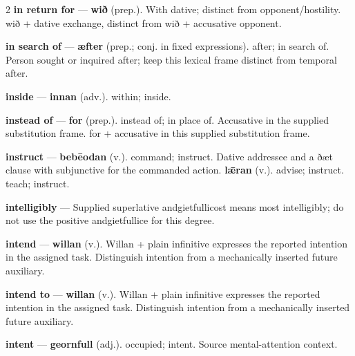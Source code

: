 \begin{multicols}{2}
\textbf{in return for} — \textbf{wið} (prep.). With dative; distinct from opponent/hostility. wið + dative exchange, distinct from wið + accusative opponent.\par
\textbf{in search of} — \textbf{æfter} (prep.; conj. in fixed expressions). after; in search of. Person sought or inquired after; keep this lexical frame distinct from temporal after.\par
\textbf{inside} — \textbf{innan} (adv.). within; inside.\par
\textbf{instead of} — \textbf{for} (prep.). instead of; in place of. Accusative in the supplied substitution frame. for + accusative in this supplied substitution frame.\par
\textbf{instruct} — \textbf{bebēodan} (v.). command; instruct. Dative addressee and a ðæt clause with subjunctive for the commanded action. \textbf{lǣran} (v.). advise; instruct. teach; instruct.\par
\textbf{intelligibly} — Supplied superlative andgietfullicost means most intelligibly; do not use the positive andgietfullice for this degree.\par
\textbf{intend} — \textbf{willan} (v.). Willan + plain infinitive expresses the reported intention in the assigned task. Distinguish intention from a mechanically inserted future auxiliary.\par
\textbf{intend to} — \textbf{willan} (v.). Willan + plain infinitive expresses the reported intention in the assigned task. Distinguish intention from a mechanically inserted future auxiliary.\par
\textbf{intent} — \textbf{geornfull} (adj.). occupied; intent. Source mental-attention context.\par

\end{multicols}
